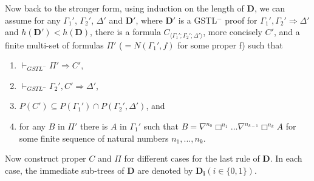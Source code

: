 Now back to the stronger form, using induction on the length of $\mathbf{D}$, we can assume for any $\Gamma_1'$, $\Gamma_2'$, $\Delta'$ and $\mathbf{D}'$, where $\mathbf{D}'$ is a GSTL$^-$ proof for $\Gamma_1' , \Gamma_2' \Rightarrow \Delta'$ and $h(\mathbf{D}')<h(\mathbf{D})$, there is a formula $C_{\langle \Gamma_1';\Gamma_2';\Delta' \rangle}$, more concisely $C'$, and a finite multi-set of formulas $\Pi'$ ($= N(\Gamma_1', f)$ for some proper f) such that
\begin{enumerate}[label=(\arabic*')]
	\item $\vdash_{GSTL^-} \Pi' \Rightarrow C'$,
	\item $\vdash_{GSTL^-} \Gamma_2' , C' \Rightarrow \Delta'$,
	\item $P(C') \subseteq P(\Gamma_1') \cap P(\Gamma_2',\Delta')$, and
	\item for any $B$ in $\Pi'$ there is $A$ in $\Gamma_1'$ such that $B = \nabla^{n_0} \Box^{n_1} \dots \nabla^{n_{k-1}} \Box^{n_k} A$ for some finite sequence of natural numbers $n_1,...,n_k$.
\end{enumerate}
Now construct proper $C$ and $\Pi$ for different cases for the last rule of $\mathbf{D}$. In each case, the immediate sub-trees of $\mathbf{D}$ are denoted by $\mathbf{D_i} (i \in \{0,1\})$.
